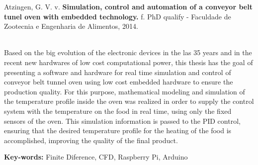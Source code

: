 \newpage

\label{abstract}
Atzingen, G. V. v. \textbf{Simulation, control and automation of a conveyor belt tunel oven with embedded technology.} \pageref{LastPage} f. PhD qualify - Faculdade de Zootecnia e Engenharia de Alimentos, 2014.

\noindent
\\Based on the big evolution of the electronic devices in the las 35 years and in the recent new hardwares of low cost computational power, this thesis has the goal of presenting a software and hardware for real time simulation and control of conveyor belt tunnel oven using low cost embedded hardware to ensure the production quality. For this purpose, mathematical modeling and simulation of the temperature profile inside the oven was realized in order to supply the control system with the temperature on the food in real time, using only the fixed sensors of the oven. This simulation information is passed to the PID control, ensuring that the desired temperature profile for the heating of the food is accomplished, improving the quality of the final product.

\par
\vspace{1em}
\noindent\textbf{Key-words:} Finite Diference, CFD, Raspberry Pi, Arduino